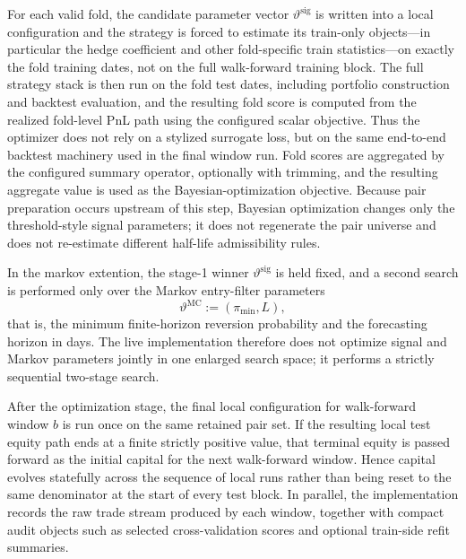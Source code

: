 \documentclass[11pt,a4paper]{article}
\begin{document}
For each valid fold, the candidate parameter vector
\(\vartheta^{\mathrm{sig}}\) is written into a local configuration and the
strategy is forced to estimate its train-only objects---in particular the
hedge coefficient and other fold-specific train statistics---on exactly the
fold training dates, not on the full walk-forward training block. The full
strategy stack is then run on the fold test dates, including portfolio
construction and backtest evaluation, and the resulting fold score is computed
from the realized fold-level PnL path using the configured scalar objective.
Thus the optimizer does not rely on a stylized surrogate loss, but on the same
end-to-end backtest machinery used in the final window run. Fold scores are
aggregated by the configured summary operator, optionally with trimming, and
the resulting aggregate value is used as the Bayesian-optimization objective.
Because pair preparation occurs upstream of this step, Bayesian optimization
changes only the threshold-style signal parameters; it does not regenerate the
pair universe and does not re-estimate different half-life admissibility rules.

In the markov extention, the stage-1 winner
\(\vartheta^{\mathrm{sig}}\) is held fixed, and a second search is performed
only over the Markov entry-filter parameters
\[
  \vartheta^{\mathrm{MC}} := (\pi_{\min}, L),
\]
that is, the minimum finite-horizon reversion probability and the forecasting
horizon in days. The live implementation therefore does not optimize signal and
Markov parameters jointly in one enlarged search space; it performs a strictly
sequential two-stage search.

After the optimization stage, the final local configuration for walk-forward
window \(b\) is run once on the same retained pair set. If the resulting local
test equity path ends at a finite strictly positive value, that terminal equity
is passed forward as the initial capital for the next walk-forward window.
Hence capital evolves statefully across the sequence of local runs rather than
being reset to the same denominator at the start of every test block. In
parallel, the implementation records the raw trade stream produced by each
window, together with compact audit objects such as selected cross-validation
scores and optional train-side refit summaries.
\end{document}

